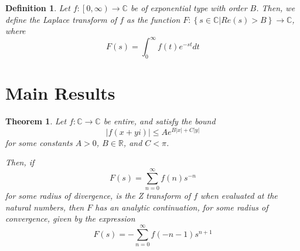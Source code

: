 \documentclass{article}
\newtheorem{definition}{Definition}
\newtheorem{theorem}{Theorem}
\begin{document}
	\begin{definition} \label{ def_Laplace_Transform }
		Let $ f : \left[ 0, \infty \right) \rightarrow \mathbb{C}$ be of exponential type with order $B$. Then, we define the Laplace transform of $f$ as the function $ F : \left\{ s \in \mathbb{C} | Re(s) > B \right\} \rightarrow \mathbb{C}$, where
		$$ F(s) = \int_{0}^{\infty} f(t) e^{-s t} dt $$
	\end{definition}

	\section{ Main Results }
	
	\begin{theorem} \label{z_transform_analytic_continuation}
		 Let $f : \mathbb{C} \rightarrow \mathbb{C}$ be entire, and satisfy the bound $$ \left| f(x + y i ) \right| \leq A e^{ B \left| x \right| + C \left| y \right| } $$ for some constants $A > 0$, $B \in \mathbb{R}$, and $C < \pi$.
		 
		 
		 Then, if $$F(s) = \sum_{n=0}^{\infty} f(n) s^{-n} $$ for some radius of divergence, is the Z transform of $f$ when evaluated at the natural numbers, then $F$ has an analytic continuation, for some radius of convergence, given by the expression 
		 $$ F(s) = -\sum_{n=0}^{\infty} f(-n-1) s^{n+1} $$
	\end{theorem}
\end{document}
